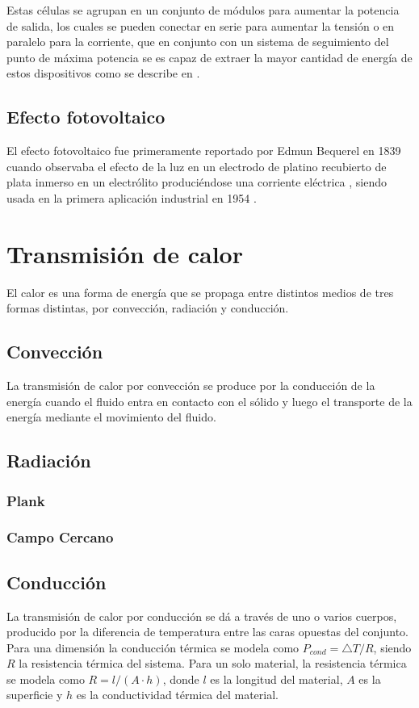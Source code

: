 Estas células se agrupan en un conjunto de módulos para aumentar la potencia de salida, los cuales se pueden conectar en serie para aumentar la tensión o en paralelo para la corriente, que en conjunto con un sistema de seguimiento del punto de máxima potencia se es capaz de extraer la mayor cantidad de energía de estos dispositivos como se describe en \cite{PhotovoltaicCell_FullDescription_EstadoDelArte_KHALIGH2018725}.
\subsection{Efecto fotovoltaico}
El efecto fotovoltaico fue primeramente reportado por Edmun Bequerel en 1839 cuando observaba el efecto de la luz en un electrodo de platino recubierto de plata inmerso en un electrólito produciéndose una corriente eléctrica \cite{PhotovoltaicEffect_History_SUDHAKAR2018117}, siendo usada en la primera aplicación industrial en 1954 \cite{PhotovoltaicEffect_History_IndustrialUse_DINCER2018707} .%

\section{Transmisión de calor}
El calor es una forma de energía que se propaga entre distintos medios de tres formas distintas, por convección, radiación y conducción.
\subsection{Convección}
La transmisión de calor por convección se produce por la conducción de la energía cuando el fluido entra en contacto con el sólido y luego el transporte de la energía mediante el movimiento del fluido.
\subsection{Radiación}

\subsubsection{Plank}
\subsubsection{Campo Cercano}
\subsection{Conducción}
La transmisión de calor por conducción se dá a través de uno o varios cuerpos, producido por la diferencia de temperatura entre las caras opuestas del conjunto. Para una dimensión la conducción térmica se modela como $P_{cond}={\bigtriangleup T}/{R} $, siendo $R$ la resistencia térmica del sistema.
Para un solo material, la resistencia térmica se modela como $R = l/{\left(A\cdot h\right)}$, donde $l$ es la longitud del material, $A$ es la superficie y $h$ es la conductividad térmica del material.\\

